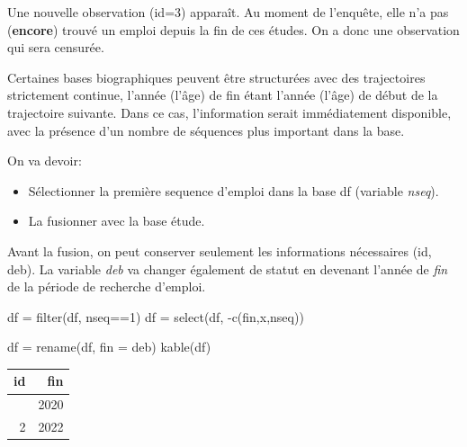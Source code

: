 \documentclass[
  12pt,
  letterpaper,
  DIV=11,
  numbers=noendperiod,
  onepage,
  openany]{scrreprt}
\newenvironment{Shaded}{\begin{snugshade}}{\end{snugshade}}
\newcommand{\AttributeTok}[1]{\textcolor[rgb]{0.80,0.80,0.80}{#1}}
\newcommand{\DecValTok}[1]{\textcolor[rgb]{0.86,0.86,0.80}{#1}}
\newcommand{\FunctionTok}[1]{\textcolor[rgb]{0.94,0.94,0.56}{#1}}
\newcommand{\NormalTok}[1]{\textcolor[rgb]{0.80,0.80,0.80}{#1}}
\newcommand{\OtherTok}[1]{\textcolor[rgb]{0.94,0.94,0.56}{#1}}
\newcommand{\SpecialCharTok}[1]{\textcolor[rgb]{0.86,0.64,0.64}{#1}}
\providecommand{\tightlist}{%
  \setlength{\itemsep}{0pt}\setlength{\parskip}{0pt}}\usepackage{longtable,booktabs,array}
\begin{document}
Une nouvelle observation (id=3) apparaît. Au moment de l'enquête, elle
n'a pas (\textbf{encore}) trouvé un emploi depuis la fin de ces études.
On a donc une observation qui sera censurée.

\begin{tcolorbox}[enhanced jigsaw, arc=.35mm, bottomrule=.15mm, titlerule=0mm, colbacktitle=quarto-callout-note-color!10!white, left=2mm, opacitybacktitle=0.6, toprule=.15mm, title=\textcolor{quarto-callout-note-color}{\faInfo}\hspace{0.5em}{Note}, colframe=quarto-callout-note-color-frame, breakable, coltitle=black, opacityback=0, toptitle=1mm, bottomtitle=1mm, rightrule=.15mm, leftrule=.75mm, colback=white]

Certaines bases biographiques peuvent être structurées avec des
trajectoires strictement continue, l'année (l'âge) de fin étant l'année
(l'âge) de début de la trajectoire suivante. Dans ce cas, l'information
serait immédiatement disponible, avec la présence d'un nombre de
séquences plus important dans la base.

\end{tcolorbox}

On va devoir:

\begin{itemize}
\tightlist
\item
  Sélectionner la première sequence d'emploi dans la base df (variable
  \emph{nseq}).
\item
  La fusionner avec la base étude.
\end{itemize}

Avant la fusion, on peut conserver seulement les informations
nécessaires (id, deb). La variable \emph{deb} va changer également de
statut en devenant l'année de \emph{fin} de la période de recherche
d'emploi.

\begin{Shaded}
\begin{Highlighting}[]
\NormalTok{df }\OtherTok{=} \FunctionTok{filter}\NormalTok{(df, nseq}\SpecialCharTok{==}\DecValTok{1}\NormalTok{)}
\NormalTok{df }\OtherTok{=} \FunctionTok{select}\NormalTok{(df, }\SpecialCharTok{{-}}\FunctionTok{c}\NormalTok{(fin,x,nseq))}

\NormalTok{df }\OtherTok{=} \FunctionTok{rename}\NormalTok{(df, }\AttributeTok{fin =}\NormalTok{ deb)}
\FunctionTok{kable}\NormalTok{(df)}
\end{Highlighting}
\end{Shaded}

\begin{longtable}[]{@{}rr@{}}
\toprule\noalign{}
id & fin \\
\midrule\noalign{}
\endhead
\bottomrule\noalign{}
\endlastfoot
1 & 2020 \\
2 & 2022 \\
\end{longtable}
\end{document}
